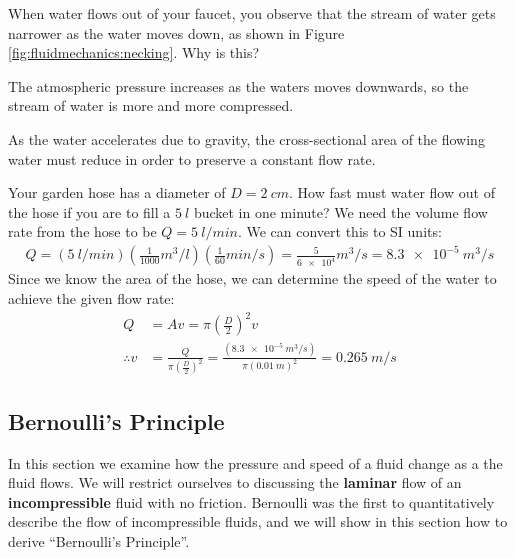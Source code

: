 {{\begin{checkpoint}
\begin{MCquestion}{When water flows out of your faucet, you observe that the stream of water gets narrower as the water moves down, as shown in Figure \ref{fig:fluidmechanics:necking}. Why is this?}
\item The atmospheric pressure increases as the waters moves downwards, so the stream of water is more and more compressed.
\item As the water accelerates due to gravity, the cross-sectional area of the flowing water must reduce in order to preserve a constant flow rate. \correct    
\end{MCquestion}
\end{checkpoint}

\begin{example}{Your garden hose has a diameter of $D=\SI{2}{cm}$. How fast must water flow out of the hose if you are to fill a $\SI{5}{l}$ bucket in one minute?}
We need the volume flow rate from the hose to be $Q=\SI{5}{l/min}$. We can convert this to SI units:
\begin{align*}
Q=(\SI{5}{l/min})\left(\frac{1}{1000}\si{m^3/l}\right) \left(\frac{1}{60}\si{min/s}\right)=\frac{5}{\num{6e4}}\si{m^3/s}=\SI{8.3e-5}{m^3/s}
\end{align*}
Since we know the area of the hose, we can determine the speed of the water to achieve the given flow rate:
\begin{align*}
Q &= Av=\pi \left(\frac{D}{2}\right)^2v \\
\therefore v&=\frac{Q}{\pi \left(\frac{D}{2}\right)^2}=\frac{(\SI{8.3e-5}{m^3/s})}{\pi(\SI{0.01}{m})^2}=\SI{0.265}{m/s}
\end{align*}
\end{example}


\subsection{Bernoulli's Principle}
In this section we examine how the pressure and speed of a fluid change as a the fluid flows. We will restrict ourselves to discussing the \textbf{laminar} flow of an \textbf{incompressible} fluid with no friction. Bernoulli was the first to quantitatively describe the flow of incompressible fluids, and we will show in this section how to derive ``Bernoulli's Principle''. 

}}
